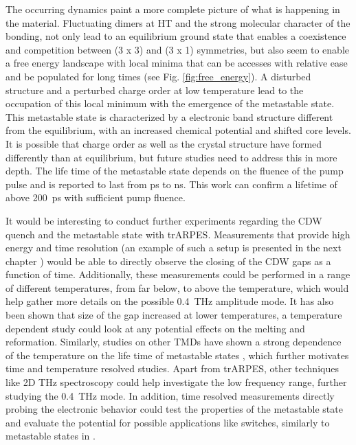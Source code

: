 The occurring dynamics paint a more complete picture of what is happening in the material.
Fluctuating  dimers at HT and the strong molecular character of the bonding, not only lead to an equilibrium ground state that enables a coexistence and competition between (3 x 3) and (3 x 1) symmetries, but also seem to enable a free energy landscape with local minima that can be accesses with relative ease and be populated for long times (see Fig. \ref{fig:free_energy}).
A disturbed structure and a perturbed charge order at low temperature lead to the occupation of this local minimum with the emergence of the metastable state.
This metastable state is characterized by a electronic band structure different from the equilibrium, with an increased chemical potential and shifted core levels.
It is possible that charge order as well as the crystal structure have formed differently than at equilibrium, but future studies need to address this in more depth.
The life time of the metastable state depends on the fluence of the pump pulse and is reported to last from \unit{\pico\second} to \unit{\nano\second}.
This work can confirm a lifetime of above \qty{200}{\pico\second} with sufficient pump fluence.

It would be interesting to conduct further experiments regarding the CDW quench and the metastable state with trARPES.
Measurements that provide high energy and time resolution (an example of such a setup is presented in the next chapter \cite{hellbruck_high-resolution_2024}) would be able to directly observe the closing of the CDW gaps as a function of time.
Additionally, these measurements could be performed in a range of different temperatures, from far below, to above the temperature, which would help gather more details on the possible \qty{0.4}{\tera\hertz} amplitude mode.
It has also been shown \cite{lin_evidence_2022} that size of the gap increased at lower temperatures, a temperature dependent study could look at any potential effects on the melting and reformation.
Similarly, studies on other TMDs have shown a strong dependence of the temperature on the life time of metastable states \cite{stojchevska_ultrafast_2014, vaskivskyi_controlling_2015}, which further motivates time and temperature resolved studies.
Apart from trARPES, other techniques like 2D \unit{\tera\hertz} spectroscopy could help investigate the low frequency range, further studying the \qty{0.4}{\tera\hertz} mode.
In addition, time resolved measurements directly probing the electronic behavior could test the properties of the metastable state and evaluate the potential for possible applications like switches, similarly to metastable states in  \cite{vaskivskyi_controlling_2015}.
